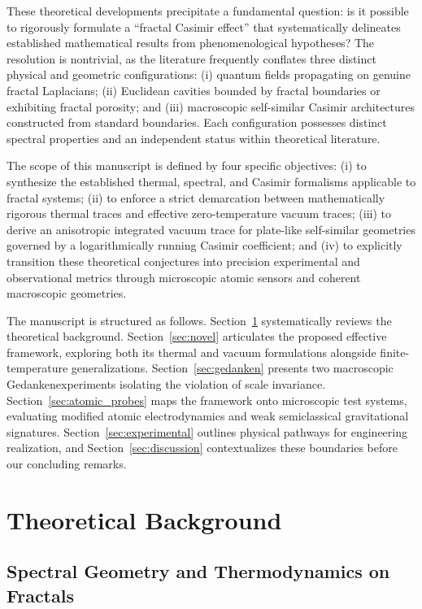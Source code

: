 \documentclass[12pt,letterpaper]{article}
\begin{document}
These theoretical developments precipitate a fundamental question: is it possible to rigorously formulate a ``fractal Casimir effect'' that systematically delineates established mathematical results from phenomenological hypotheses?
The resolution is nontrivial, as the literature frequently conflates three distinct physical and geometric configurations: (i) quantum fields propagating on genuine fractal Laplacians;
(ii) Euclidean cavities bounded by fractal boundaries or exhibiting fractal porosity; and (iii) macroscopic self-similar Casimir architectures constructed from standard boundaries.
Each configuration possesses distinct spectral properties and an independent status within theoretical literature.

The scope of this manuscript is defined by four specific objectives: (i) to synthesize the established thermal, spectral, and Casimir formalisms applicable to fractal systems;
(ii) to enforce a strict demarcation between mathematically rigorous thermal traces and effective zero-temperature vacuum traces;
(iii) to derive an anisotropic integrated vacuum trace for plate-like self-similar geometries governed by a logarithmically running Casimir coefficient; and
(iv) to explicitly transition these theoretical conjectures into precision experimental and observational metrics through microscopic atomic sensors and coherent macroscopic geometries.

The manuscript is structured as follows. Section~\ref{sec:prior} systematically reviews the theoretical background. Section~\ref{sec:novel} articulates the proposed effective framework, exploring both its thermal and vacuum formulations alongside finite-temperature generalizations. Section~\ref{sec:gedanken} presents two macroscopic Gedankenexperiments isolating the violation of scale invariance. Section~\ref{sec:atomic_probes} maps the framework onto microscopic test systems, evaluating modified atomic electrodynamics and weak semiclassical gravitational signatures. Section~\ref{sec:experimental} outlines physical pathways for engineering realization, and Section~\ref{sec:discussion} contextualizes these boundaries before our concluding remarks.

\section{Theoretical Background}
\label{sec:prior}

\subsection{Spectral Geometry and Thermodynamics on Fractals}
\end{document}

